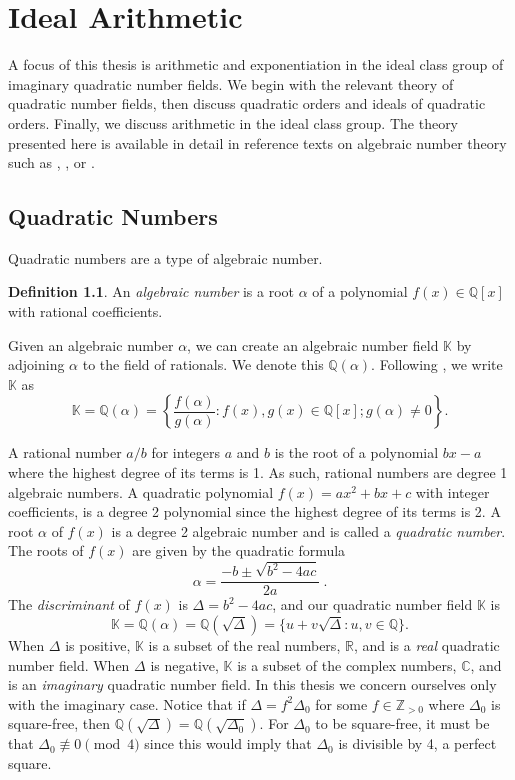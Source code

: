\documentclass{ucalgthes1}
\theoremstyle{definition}
\newtheorem{defn}[thm]{Definition}
\newcommand{\CC}{\mathbb{C}}
\newcommand{\RR}{\mathbb{R}}
\newcommand{\KK}{\mathbb{K}}
\newcommand{\QQ}{\mathbb{Q}}
\newcommand{\ZZgtz}{\mathbb{Z}_{>0}}
\begin{document}
\setcounter{chapter}{1}
\chapter{Ideal Arithmetic}
\label{chap:idealArithmetic}

A focus of this thesis is arithmetic and exponentiation in the ideal class group of imaginary quadratic number fields.  We begin with the relevant theory of quadratic number fields, then discuss quadratic orders and ideals of quadratic orders.  Finally, we discuss arithmetic in the ideal class group.  The theory presented here is available in detail in reference texts on algebraic number theory such as \cite{Ireland1990}, \cite{Hua82}, or \cite{Cohn1980}. 



\section{Quadratic Numbers}

Quadratic numbers are a type of algebraic number.

\begin{defn}
An \emph{algebraic number} is a root $\alpha$ of a polynomial $f(x) \in \QQ[x]$ with rational coefficients.
\end{defn}

\noindent
Given an algebraic number $\alpha$, we can create an algebraic number field $\KK$ by adjoining $\alpha$ to the field of rationals.  We denote this $\QQ(\alpha)$. Following \cite[p.76]{Jacobson2009}, we write $\KK$ as 
\[
	\KK = \QQ(\alpha) = \left\{ \frac{f(\alpha)}{g(\alpha)} : f(x), g(x) \in \QQ[x]; g(\alpha) \ne 0 \right\}.
\]

\noindent
A rational number $a/b$ for integers $a$ and $b$ is the root of a polynomial $bx-a$ where the highest degree of its terms is 1.  As such, rational numbers are degree 1 algebraic numbers. A quadratic polynomial $f(x) = ax^2 + bx + c$ with integer coefficients, is a degree 2 polynomial since the highest degree of its terms is 2.  A root $\alpha$ of $f(x)$ is a degree 2 algebraic number and is called a \emph{quadratic number}.  The roots of $f(x)$ are given by the quadratic formula
\[
	\alpha = \frac{-b \pm \sqrt{b^2 - 4ac}}{2a} ~.
\]
The \emph{discriminant} of $f(x)$ is $\Delta = b^2 - 4ac$, and our quadratic number field $\KK$ is 
\[
	\KK = \QQ(\alpha) = \QQ(\sqrt{\Delta}) = \{u + v\sqrt{\Delta} : u,v \in \QQ\}.
\]
When $\Delta$ is positive, $\KK$ is a subset of the real numbers, $\RR$, and is a \emph{real} quadratic number field. When $\Delta$ is negative, $\KK$ is a subset of the complex numbers, $\CC$, and is an \emph{imaginary} quadratic number field.  In this thesis we concern ourselves only with the imaginary case.  Notice that if $\Delta = f^2 \Delta_0$ for some $f \in \ZZgtz$ where $\Delta_0$ is square-free, then $\QQ(\sqrt{\Delta}) = \QQ(\sqrt{\Delta_0})$. For $\Delta_0$ to be square-free, it must be that $\Delta_0 \not\equiv 0 \pmod 4$ since this would imply that $\Delta_0$ is divisible by 4, a perfect square.  
\end{document}
